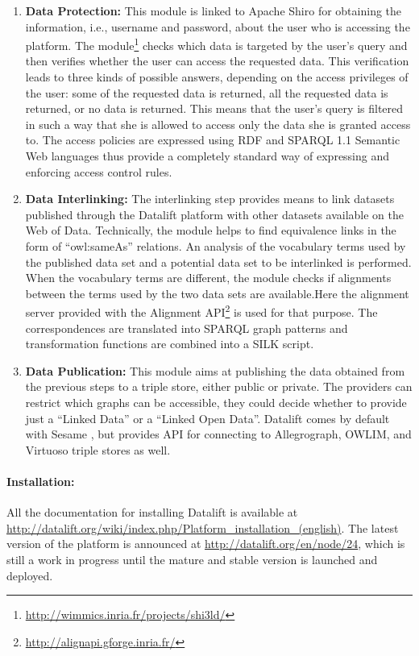 \begin{enumerate}
\item {\textbf{Data Protection:}}
This module is linked to Apache Shiro for obtaining the information, i.e., username and password, about the user who is accessing the platform. The module\footnote{\url{http://wimmics.inria.fr/projects/shi3ld/}} checks which data is targeted by the user's query and then verifies whether the user can access the requested data. This verification leads to three kinds of possible answers, depending on the access privileges of the user: some of the requested data is returned, all the requested data is returned, or no data is returned. This means that the user's query is filtered in such a way that she is allowed to access only the data she is granted access to. The access policies are expressed using RDF and SPARQL 1.1 \cite{sparql11} Semantic Web languages thus provide a completely standard way of expressing and enforcing access control rules.

\item{\textbf{Data Interlinking:}}
The interlinking step provides means to link datasets published through the Datalift platform with other datasets available on the Web of Data. Technically, the module helps to find equivalence links in the form of ``owl:sameAs'' relations. An analysis of the vocabulary terms used by the published data set and a potential data set to be interlinked is performed. When the vocabulary terms are different, the module checks if alignments between the terms used by the two data sets are available.Here the alignment server provided with the Alignment API\footnote{\url{http://alignapi.gforge.inria.fr/}} is used for that purpose. The correspondences are translated into SPARQL graph patterns and transformation functions are combined into a SILK script.

\item{\textbf{Data Publication:}}
This module aims at publishing the data obtained from the previous steps to a triple store, either public or private. The providers can restrict which graphs can be accessible, they could decide whether to provide just a ``Linked Data'' or a ``Linked Open Data''. Datalift comes by default with Sesame , but provides API for connecting to Allegrograph, OWLIM, and Virtuoso triple stores as well.
\end{enumerate}


\paragraph{Installation:}
All the documentation for installing Datalift is available at \url{http://datalift.org/wiki/index.php/Platform_installation_(english)}. The latest version of the platform is announced at \url{http://datalift.org/en/node/24}, which is still a work in progress until the mature and stable version is launched and deployed.

